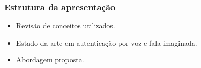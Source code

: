 \begin{frame}
	\frametitle{Estrutura da apresentação}
	\begin{itemize}
		\item Revisão de conceitos utilizados.
		\item Estado-da-arte em autenticação por voz e fala imaginada.
		\item Abordagem proposta.
	\end{itemize}
\end{frame}